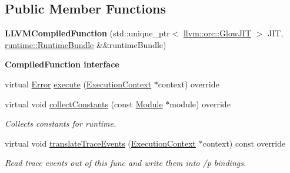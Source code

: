 \subsection*{Public Member Functions}
\begin{DoxyCompactItemize}
\item 
\mbox{\label{classglow_1_1_l_l_v_m_compiled_function_adc204f1f491a163b475776d2ccdc7966}} 
{\bfseries L\+L\+V\+M\+Compiled\+Function} (std\+::unique\+\_\+ptr$<$ \hyperlink{classllvm_1_1orc_1_1_glow_j_i_t}{llvm\+::orc\+::\+Glow\+J\+IT} $>$ J\+IT, \hyperlink{classglow_1_1runtime_1_1_runtime_bundle}{runtime\+::\+Runtime\+Bundle} \&\&runtime\+Bundle)
\end{DoxyCompactItemize}
\begin{Indent}\textbf{ Compiled\+Function interface}\par
\begin{DoxyCompactItemize}
\item 
virtual \hyperlink{namespaceglow_afdb176c3a672ef66db0ecfc19a8d39bf}{Error} \hyperlink{classglow_1_1_l_l_v_m_compiled_function_a5589e30446aa3a92f3e94267bded99ae}{execute} (\hyperlink{classglow_1_1_execution_context}{Execution\+Context} $\ast$context) override
\item 
\mbox{\label{classglow_1_1_l_l_v_m_compiled_function_a6c4001d8066b22d5d95996a8d92ed24b}} 
virtual void \hyperlink{classglow_1_1_l_l_v_m_compiled_function_a6c4001d8066b22d5d95996a8d92ed24b}{collect\+Constants} (const \hyperlink{classglow_1_1_module}{Module} $\ast$module) override
\begin{DoxyCompactList}\small\item\em Collects constants for runtime. \end{DoxyCompactList}\item 
\mbox{\label{classglow_1_1_l_l_v_m_compiled_function_ae3d3e8455d95a4062bdd73e7b258b179}} 
virtual void \hyperlink{classglow_1_1_l_l_v_m_compiled_function_ae3d3e8455d95a4062bdd73e7b258b179}{translate\+Trace\+Events} (\hyperlink{classglow_1_1_execution_context}{Execution\+Context} $\ast$context) const override
\begin{DoxyCompactList}\small\item\em Read trace events out of this func and write them into /p bindings. \end{DoxyCompactList}\end{DoxyCompactItemize}
\end{Indent}

